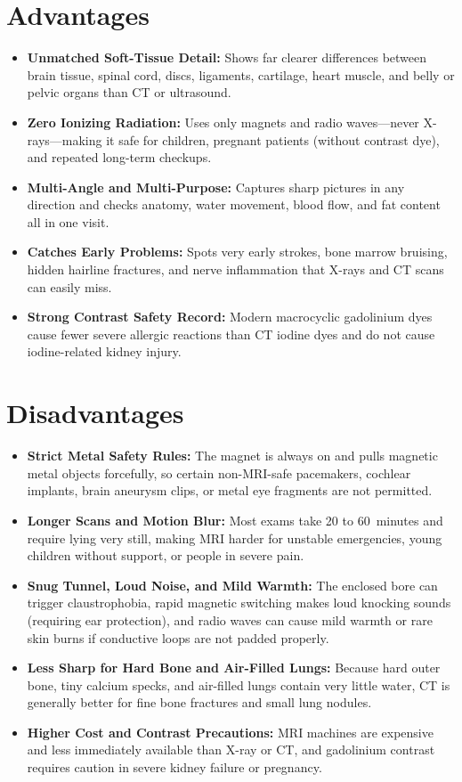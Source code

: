 \section{Advantages}
\begin{itemize}
\item \textbf{Unmatched Soft-Tissue Detail:} Shows far clearer differences between brain tissue, spinal cord, discs, ligaments, cartilage, heart muscle, and belly or pelvic organs than CT or ultrasound.
\item \textbf{Zero Ionizing Radiation:} Uses only magnets and radio waves---never X-rays---making it safe for children, pregnant patients (without contrast dye), and repeated long-term checkups.
\item \textbf{Multi-Angle and Multi-Purpose:} Captures sharp pictures in any direction and checks anatomy, water movement, blood flow, and fat content all in one visit.
\item \textbf{Catches Early Problems:} Spots very early strokes, bone marrow bruising, hidden hairline fractures, and nerve inflammation that X-rays and CT scans can easily miss.
\item \textbf{Strong Contrast Safety Record:} Modern macrocyclic gadolinium dyes cause fewer severe allergic reactions than CT iodine dyes and do not cause iodine-related kidney injury.
\end{itemize}

\section{Disadvantages}
\begin{itemize}
\item \textbf{Strict Metal Safety Rules:} The magnet is always on and pulls magnetic metal objects forcefully, so certain non-MRI-safe pacemakers, cochlear implants, brain aneurysm clips, or metal eye fragments are not permitted.
\item \textbf{Longer Scans and Motion Blur:} Most exams take 20 to 60~minutes and require lying very still, making MRI harder for unstable emergencies, young children without support, or people in severe pain.
\item \textbf{Snug Tunnel, Loud Noise, and Mild Warmth:} The enclosed bore can trigger claustrophobia, rapid magnetic switching makes loud knocking sounds (requiring ear protection), and radio waves can cause mild warmth or rare skin burns if conductive loops are not padded properly.
\item \textbf{Less Sharp for Hard Bone and Air-Filled Lungs:} Because hard outer bone, tiny calcium specks, and air-filled lungs contain very little water, CT is generally better for fine bone fractures and small lung nodules.
\item \textbf{Higher Cost and Contrast Precautions:} MRI machines are expensive and less immediately available than X-ray or CT, and gadolinium contrast requires caution in severe kidney failure or pregnancy.
\end{itemize}

